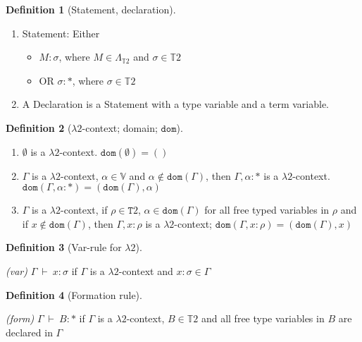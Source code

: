 \documentclass[12pt, a4paper]{article}
\newcommand{\deriv}{\ \vdash\ }
\newtheorem{definition}{Definition}[section]
\begin{document}
\begin{definition}[Statement, declaration]
\end{definition}
\begin{enumerate}
    \item Statement: Either 
    \begin{itemize}
        \item $M : \sigma$, where $M \in \Lambda_{\mathbb{T}2}$ and $\sigma \in \mathbb{T}2$
        \item OR $\sigma : *$, where $\sigma \in \mathbb{T}2$
    \end{itemize}
    \item A Declaration is a Statement with a type variable and a term variable.
\end{enumerate}

\begin{definition}[$\lambda2$-context; domain; $\mathtt{dom}$]
\end{definition}
\begin{enumerate}
    \item $\emptyset$ is a $\lambda2$-context. $\mathtt{dom}(\emptyset) = ()$
    \item $\Gamma$ is a $\lambda2$-context, $\alpha \in \mathbb{V}$ and $\alpha \notin \mathtt{dom}(\Gamma)$, then $\Gamma, \alpha : *$ is a $\lambda2$-context. $\mathtt{dom}(\Gamma, \alpha : *) = (\mathtt{dom}(\Gamma), \alpha)$
    \item $\Gamma$ is a $\lambda2$-context, if $\rho \in \mathtt{T}2$, $\alpha \in \mathtt{dom}(\Gamma)$ for all free typed variables in $\rho$ and if $x \notin \mathtt{dom}(\Gamma)$, then $\Gamma, x : \rho$ is a $\lambda2$-context; $\mathtt{dom}(\Gamma, x : \rho) = (\mathtt{dom}(\Gamma), x)$
\end{enumerate}

\begin{definition}[Var-rule for $\lambda2$]
\end{definition}
\textit{(var)} $\Gamma \deriv x : \sigma$ if $\Gamma$ is a $\lambda2$-context and $x : \sigma \in \Gamma$

\begin{definition}[Formation rule]
\end{definition}
\textit{(form)} $\Gamma \deriv B : *$ if $\Gamma$ is a $\lambda2$-context, $B \in \mathbb{T}2$ and all free type variables in $B$ are declared in $\Gamma$
\end{document}

